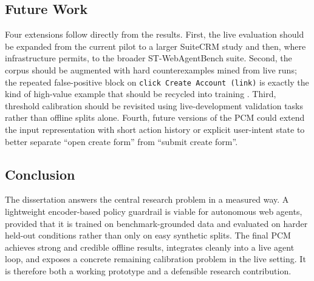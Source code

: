 \documentclass[12pt,a4paper]{article}
\begin{document}
\subsection{Future Work}

Four extensions follow directly from the results. First, the live evaluation
should be expanded from the current pilot to a larger SuiteCRM study and then,
where infrastructure permits, to the broader ST-WebAgentBench suite. Second,
the corpus should be augmented with hard counterexamples mined from live runs;
the repeated false-positive block on \texttt{click Create Account (link)} is
exactly the kind of high-value example that should be recycled into training
\citep{li2023synthetic,he2023tdg}. Third, threshold calibration should be
revisited using live-development validation tasks rather than offline splits
alone. Fourth, future versions of the PCM could extend the input representation
with short action history or explicit user-intent state to better separate
``open create form'' from ``submit create form''.

\subsection{Conclusion}

The dissertation answers the central research problem in a measured way. A
lightweight encoder-based policy guardrail is viable for autonomous web agents,
provided that it is trained on benchmark-grounded data and evaluated on harder
held-out conditions rather than only on easy synthetic splits. The final PCM
achieves strong and credible offline results, integrates cleanly into a live
agent loop, and exposes a concrete remaining calibration problem in the live
setting. It is therefore both a working prototype and a defensible research
contribution.
\end{document}
